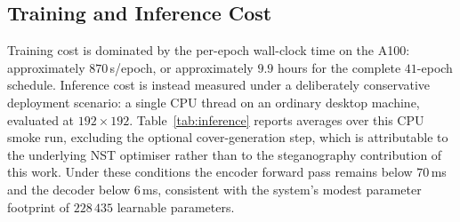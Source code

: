 \documentclass[conference]{IEEEtran}
\begin{document}
\subsection{Training and Inference Cost}
\label{sec:inference}
Training cost is dominated by the per-epoch wall-clock time on the A100: approximately $870$\,s/epoch, or approximately $9.9$ hours for the complete $41$-epoch schedule. Inference cost is instead measured under a deliberately conservative deployment scenario: a single CPU thread on an ordinary desktop machine, evaluated at $192\!\times\!192$. Table~\ref{tab:inference} reports averages over this CPU smoke run, excluding the optional cover-generation step, which is attributable to the underlying NST optimiser rather than to the steganography contribution of this work. Under these conditions the encoder forward pass remains below $70$\,ms and the decoder below $6$\,ms, consistent with the system's modest parameter footprint of $228\,435$ learnable parameters.

\begin{table}[t]
\centering
\caption{Training and inference budget. The GPU row is measured on our benchmark run on a Colab A100; the CPU rows come from the CPU smoke run on a desktop single-thread baseline at $192\!\times\!192$.}
\label{tab:inference}
\setlength{\tabcolsep}{3pt}
\footnotesize
{}
\end{table}
\end{document}
